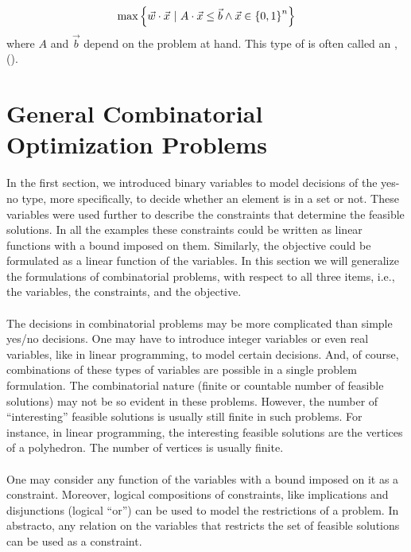 \begin{definition}
\begin{equation}
\max\left\{ \vec{w}\cdot\vec{x}\ |\ A\cdot\vec{x}\leq\vec{b}\wedge \vec{x}\in\left\{ 0,1 \right\}^n \right\}
\end{equation}
where $A$ and $\vec{b}$ depend on the problem at hand. This type of  is often called an , ().

\section{General Combinatorial Optimization Problems}

In the first section, we introduced binary variables to model decisions of the yes-no type, more specifically, to decide whether an element is in a set or not. These variables were used further to describe the constraints that determine the feasible solutions. In all the examples these constraints could be written as linear functions with a bound imposed on them. Similarly, the objective could be formulated as a linear function of the variables. In this section we will generalize the formulations of combinatorial problems, with respect to all three items, i.e., the variables, the constraints, and the objective.

\paragraph{}
The decisions in combinatorial problems may be more complicated than simple yes/no decisions. One may have to introduce integer variables or even real variables, like in linear programming, to model certain decisions. And, of course, combinations of these types of variables are possible in a single problem formulation. The combinatorial nature (finite or countable number of feasible solutions) may not be so evident in these problems. However, the number of ``interesting'' feasible solutions is usually still finite in such problems. For instance, in linear programming, the interesting feasible solutions are the vertices
of a polyhedron. The number of vertices is usually finite.

\paragraph{}
One may consider any function of the variables with a bound imposed on it as a constraint. Moreover, logical compositions of constraints, like implications and disjunctions (logical ``or'') can be used to model
the restrictions of a problem. In abstracto, any relation on the variables that restricts the set of feasible solutions can be used as a constraint.


\end{definition}
